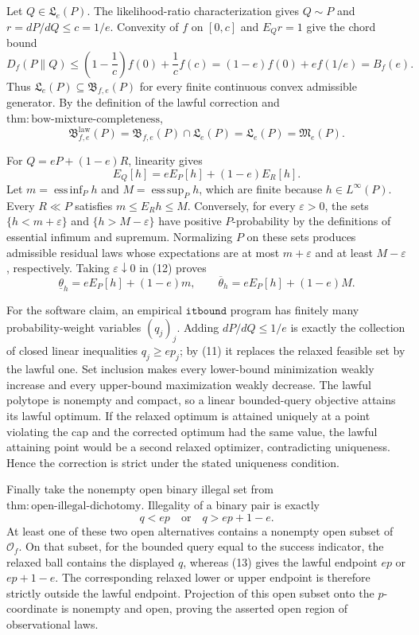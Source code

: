 Let \(Q\in\mathfrak L_e(P)\).  The likelihood-ratio characterization gives \(Q\sim P\) and \(r=dP/dQ\le c=1/e\).  Convexity of \(f\) on \([0,c]\) and \(E_Qr=1\) give the chord bound
\[
 D_f(P\|Q)
 \le \left(1-\frac1c\right)f(0)+\frac1c f(c)
 =(1-e)f(0)+ef(1/e)=B_f(e). \tag{10}
\]
Thus \(\mathfrak L_e(P)\subseteq\mathfrak B_{f,e}(P)\) for every finite continuous convex admissible generator.  By the definition of the lawful correction and \(\mathrm{thm:bow\text{-}mixture\text{-}completeness}\),
\[
 \mathfrak B^{\mathrm{law}}_{f,e}(P)
 =\mathfrak B_{f,e}(P)\cap\mathfrak L_e(P)
 =\mathfrak L_e(P)=\mathfrak M_e(P). \tag{11}
\]

For \(Q=eP+(1-e)R\), linearity gives
\[
 E_Q[h]=eE_P[h]+(1-e)E_R[h]. \tag{12}
\]
Let \(m=\operatorname*{ess\,inf}_P h\) and \(M=\operatorname*{ess\,sup}_P h\), which are finite because \(h\in L^\infty(P)\).  Every \(R\ll P\) satisfies \(m\le E_Rh\le M\).  Conversely, for every \(\varepsilon>0\), the sets \(\{h<m+\varepsilon\}\) and \(\{h>M-\varepsilon\}\) have positive \(P\)-probability by the definitions of essential infimum and supremum.  Normalizing \(P\) on these sets produces admissible residual laws whose expectations are at most \(m+\varepsilon\) and at least \(M-\varepsilon\), respectively.  Taking \(\varepsilon\downarrow0\) in (12) proves
\[
 \underline\theta_h=eE_P[h]+(1-e)m,\qquad
 \overline\theta_h=eE_P[h]+(1-e)M. \tag{13}
\]

For the software claim, an empirical \(\texttt{itbound}\) program has finitely many probability-weight variables \((q_j)_j\).  Adding \(dP/dQ\le1/e\) is exactly the collection of closed linear inequalities \(q_j\ge ep_j\); by (11) it replaces the relaxed feasible set by the lawful one.  Set inclusion makes every lower-bound minimization weakly increase and every upper-bound maximization weakly decrease.  The lawful polytope is nonempty and compact, so a linear bounded-query objective attains its lawful optimum.  If the relaxed optimum is attained uniquely at a point violating the cap and the corrected optimum had the same value, the lawful attaining point would be a second relaxed optimizer, contradicting uniqueness.  Hence the correction is strict under the stated uniqueness condition.

Finally take the nonempty open binary illegal set from \(\mathrm{thm:open\text{-}illegal\text{-}dichotomy}\).  Illegality of a binary pair is exactly
\[
 q<ep\quad\text{or}\quad q>ep+1-e.
\]
At least one of these two open alternatives contains a nonempty open subset of \(\mathcal O_f\).  On that subset, for the bounded query equal to the success indicator, the relaxed ball contains the displayed \(q\), whereas (13) gives the lawful endpoint \(ep\) or \(ep+1-e\).  The corresponding relaxed lower or upper endpoint is therefore strictly outside the lawful endpoint.  Projection of this open subset onto the \(p\)-coordinate is nonempty and open, proving the asserted open region of observational laws.